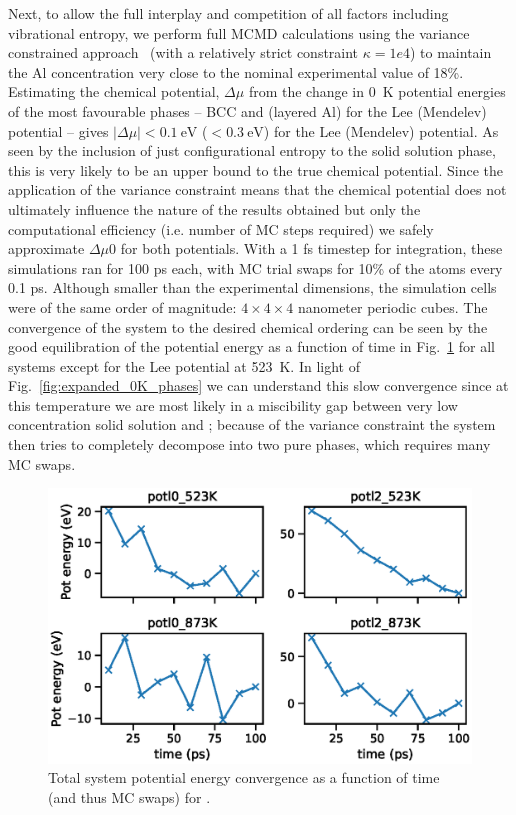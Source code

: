 Next, to allow the full interplay and competition of all factors including vibrational entropy, we perform full MCMD calculations using the variance constrained approach~\cite{sadigh2012calculation, sadigh2012scalable} (with a relatively strict constraint $\kappa = 1e4$) to maintain the Al concentration very close to the nominal experimental value of 18\%.
Estimating the chemical potential, $\Delta \mu$ from the change in 0~K potential energies of the most favourable phases -- BCC and \DOTHREE (layered Al) for the Lee (Mendelev) potential -- gives $|\Delta \mu| < 0.1~\mathrm{eV}$ ($<0.3~\mathrm{eV}$) for the Lee (Mendelev) potential.
As seen by the inclusion of just configurational entropy to the solid solution phase, this is very likely to be an upper bound to the true chemical potential.
Since the application of the variance constraint means that the chemical potential does not ultimately influence the nature of the results obtained but only the computational efficiency (i.e. number of MC steps required) we safely approximate $\Delta \mu 0 $ for both potentials.
With a 1 fs timestep for integration, these simulations ran for 100 ps each, with MC trial swaps for 10\% of the atoms every 0.1 ps.
Although smaller than the experimental dimensions, the simulation cells were of the same order of magnitude: $4\times4\times4$ nanometer periodic cubes.
The convergence of the system to the desired chemical ordering can be seen by the good equilibration of the potential energy as a function of time in Fig.~\ref{fig:energy_conv} for all systems except for the Lee potential  at 523~K.
In light of Fig.~\ref{fig:expanded_0K_phases} we can understand this slow convergence since at this temperature we are most likely in a miscibility gap between very low concentration solid solution and \DOTHREE;
because of the variance constraint the system then tries to completely decompose into two pure phases, which requires many MC swaps.
%
\begin{figure}[h]
    \centering
    \includegraphics[width=\textwidth]{figures/energy_conv}
    \caption{Total system potential energy convergence as a function of time (and thus MC swaps) for .}
    \label{fig:energy_conv}
\end{figure}

